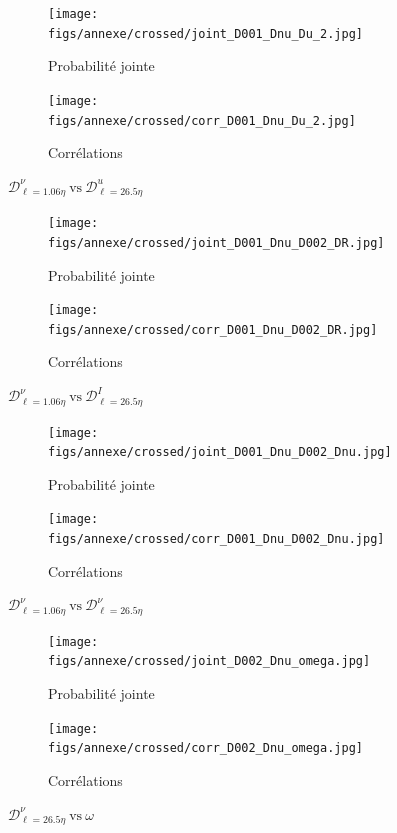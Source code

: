 \documentclass[13pt, a4paper]{extarticle}
\begin{document}
\begin{figure}[H]
  \centering
  \begin{subfigure}[b]{0.48\linewidth}
  \centering
  \texttt{[image: figs/annexe/crossed/joint\_D001\_Dnu\_Du\_2.jpg]}
  \caption{Probabilité jointe}
  \end{subfigure}
  \begin{subfigure}[b]{0.48\linewidth}
    \centering
    \texttt{[image: figs/annexe/crossed/corr\_D001\_Dnu\_Du\_2.jpg]}
    \caption{Corrélations}
    \end{subfigure}
    \caption{$\mathscr{D}^\nu_{\ell=1.06\eta}~\text{vs}~\mathscr{D}^u_{\ell=26.5\eta}$}
\end{figure}

\begin{figure}[H]
  \centering
  \begin{subfigure}[b]{0.48\linewidth}
  \centering
  \texttt{[image: figs/annexe/crossed/joint\_D001\_Dnu\_D002\_DR.jpg]}
  \caption{Probabilité jointe}
  \end{subfigure}
  \begin{subfigure}[b]{0.48\linewidth}
    \centering
    \texttt{[image: figs/annexe/crossed/corr\_D001\_Dnu\_D002\_DR.jpg]}
    \caption{Corrélations}
    \end{subfigure}
    \caption{$\mathscr{D}^\nu_{\ell=1.06\eta}~\text{vs}~\mathscr{D}^I_{\ell=26.5\eta}$}
\end{figure}

\begin{figure}[H]
  \centering
  \begin{subfigure}[b]{0.48\linewidth}
  \centering
  \texttt{[image: figs/annexe/crossed/joint\_D001\_Dnu\_D002\_Dnu.jpg]}
  \caption{Probabilité jointe}
  \end{subfigure}
  \begin{subfigure}[b]{0.48\linewidth}
    \centering
    \texttt{[image: figs/annexe/crossed/corr\_D001\_Dnu\_D002\_Dnu.jpg]}
    \caption{Corrélations}
    \end{subfigure}
    \caption{$\mathscr{D}^\nu_{\ell=1.06\eta}~\text{vs}~\mathscr{D}^\nu_{\ell=26.5\eta}$}
\end{figure}

\begin{figure}[H]
  \centering
  \begin{subfigure}[b]{0.48\linewidth}
  \centering
  \texttt{[image: figs/annexe/crossed/joint\_D002\_Dnu\_omega.jpg]}
  \caption{Probabilité jointe}
  \end{subfigure}
  \begin{subfigure}[b]{0.48\linewidth}
    \centering
    \texttt{[image: figs/annexe/crossed/corr\_D002\_Dnu\_omega.jpg]}
    \caption{Corrélations}
    \end{subfigure}
    \caption{$\mathscr{D}^\nu_{\ell=26.5\eta}~\text{vs}~\omega$}
\end{figure}
\end{document}
